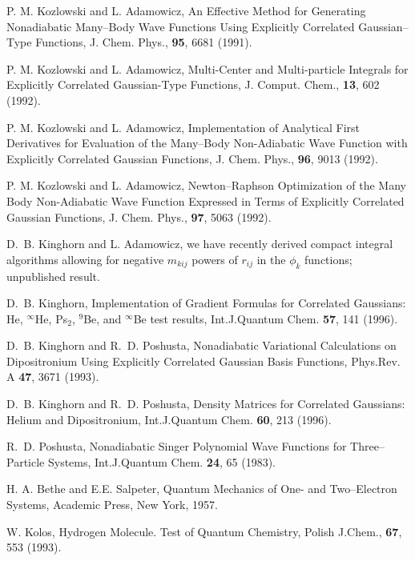 {{\begin{thebibliography}{999}
{
P. M. Kozlowski and L. Adamowicz, 
An Effective Method for Generating Nonadiabatic
Many--Body Wave Functions Using Explicitly Correlated
Gaussian--Type Functions,
J. Chem. Phys., {\bf 95}, 6681 (1991).

P. M. Kozlowski and L. Adamowicz, 
Multi-Center and Multi-particle Integrals for
Explicitly Correlated Gaussian-Type Functions,
J. Comput. Chem., {\bf 13}, 602 (1992).


P. M. Kozlowski and L. Adamowicz, 
Implementation of Analytical First Derivatives for
Evaluation of the Many--Body Non-Adiabatic Wave Function
with Explicitly Correlated Gaussian Functions,
J. Chem. Phys., {\bf 96}, 9013 (1992).

P. M. Kozlowski and L. Adamowicz, 
Newton--Raphson Optimization of the Many Body
Non-Adiabatic Wave Function Expressed in Terms of Explicitly
Correlated Gaussian Functions,
J. Chem. Phys., {\bf 97}, 5063 (1992).



D.~B. Kinghorn and L. Adamowicz, we have recently derived
compact integral algorithms allowing for negative $m_{kij}$ powers
of $r_{ij}$ in the $\phi_k$ functions; unpublished result.


D.~B. Kinghorn,
Implementation of Gradient Formulas for Correlated
Gaussians: He, $^{\infty}$He, Ps$_2$, $^9$Be, and $^{\infty}$Be
test results,
\newblock Int.J.Quantum Chem. {\bf 57}, 141 (1996).

D.~B. Kinghorn and R.~D. Poshusta,
Nonadiabatic Variational Calculations on Dipositronium
Using Explicitly Correlated Gaussian Basis Functions,
\newblock Phys.Rev. A {\bf 47}, 3671 (1993).

D.~B. Kinghorn and R.~D. Poshusta,
Density Matrices for Correlated Gaussians: Helium and
Dipositronium,
\newblock Int.J.Quantum Chem. {\bf 60}, 213 (1996).

R.~D. Poshusta,
Nonadiabatic Singer Polynomial Wave Functions for 
Three--Particle Systems,
\newblock Int.J.Quantum Chem. 
{\bf 24}, 65 (1983).


H. A. Bethe and E.E. Salpeter, {\rm Quantum Mechanics of One- and
Two--Electron Systems}, Academic Press, New York, 1957.

W. Kolos, Hydrogen Molecule. Test of Quantum Chemistry,
Polish J.Chem., {\bf 67}, 553 (1993).



}
\end{thebibliography}}}
